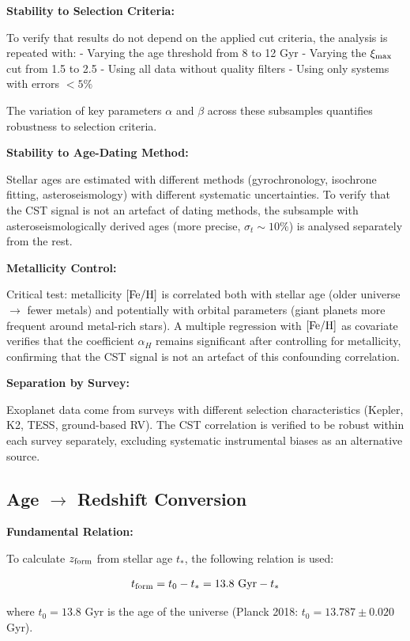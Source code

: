 \documentclass[11pt,a4paper]{article}
\begin{document}
\textbf{Stability to Selection Criteria:}

To verify that results do not depend on the applied cut criteria, the
analysis is repeated with: - Varying the age threshold from 8 to 12 Gyr
- Varying the \(\xi_{\rm max}\) cut from 1.5 to 2.5 - Using all data
without quality filters - Using only systems with errors \(< 5\%\)

The variation of key parameters \(\alpha\) and \(\beta\) across these
subsamples quantifies robustness to selection criteria.

\textbf{Stability to Age-Dating Method:}

Stellar ages are estimated with different methods (gyrochronology,
isochrone fitting, asteroseismology) with different systematic
uncertainties. To verify that the CST signal is not an artefact of
dating methods, the subsample with asteroseismologically derived ages
(more precise, \(\sigma_t \sim 10\%\)) is analysed separately from the
rest.

\textbf{Metallicity Control:}

Critical test: metallicity \([{\rm Fe/H}]\) is correlated both with
stellar age (older universe $\rightarrow$ fewer metals) and potentially with orbital
parameters (giant planets more frequent around metal-rich stars). A
multiple regression with \([{\rm Fe/H}]\) as covariate verifies that the
coefficient \(\alpha_H\) remains significant after controlling for
metallicity, confirming that the CST signal is not an artefact of this
confounding correlation.

\textbf{Separation by Survey:}

Exoplanet data come from surveys with different selection
characteristics (Kepler, K2, TESS, ground-based RV). The CST correlation
is verified to be robust within each survey separately, excluding
systematic instrumental biases as an alternative source.

\hypertarget{age-redshift-conversion}{%
\subsection{Age $\rightarrow$ Redshift
Conversion}\label{age-redshift-conversion}}

\textbf{Fundamental Relation:}

To calculate \(z_{\rm form}\) from stellar age \(t_*\), the following
relation is used:

\[t_{\rm form} = t_0 - t_* = 13.8~{\rm Gyr} - t_*\]

where \(t_0 = 13.8\) Gyr is the age of the universe (Planck 2018:
\(t_0 = 13.787 \pm 0.020\) Gyr).
\end{document}
